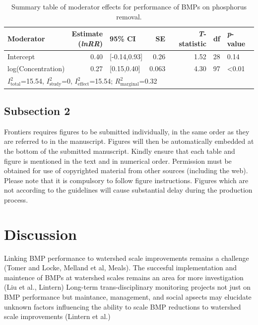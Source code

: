\documentclass[utf8]{FrontiersinHarvard}
\begin{document}
\begin{table}

\caption{Summary table of moderator effects for performance of BMPs on phosphorus removal.}
\centering
\begin{tabular}[t]{lrlrrrl}
\toprule
Moderator & \makecell[r]{Estimate\\(\textit{lnRR})} & 95\% CI & SE & \textit{T}-statistic & df & \textit{p}-value\\
\midrule
Intercept & 0.40 & {}[-0.14,0.93] & 0.26 & 1.52 & 28 & 0.14\\
log(Concentration) & 0.27 & {}[0.15,0.40] & 0.063 & 4.30 & 97 & \textless 0.01\\
\bottomrule
\multicolumn{7}{l}{\rule{0pt}{1em}$I^{2}_{\text{total}}$=15.54, $I^{2}_{\text{study}}$=0, $I^{2}_{\text{effect}}$=15.54; $R^{2}_{\text{marginal}}$=0.32}\\
\end{tabular}
\end{table}

\hypertarget{subsection-2}{%
\subsection{Subsection 2}\label{subsection-2}}

Frontiers requires figures to be submitted individually, in the same
order as they are referred to in the manuscript. Figures will then be
automatically embedded at the bottom of the submitted manuscript. Kindly
ensure that each table and figure is mentioned in the text and in
numerical order. Permission must be obtained for use of copyrighted
material from other sources (including the web). Please note that it is
compulsory to follow figure instructions. Figures which are not
according to the guidelines will cause substantial delay during the
production process.

\hypertarget{discussion}{%
\section{Discussion}\label{discussion}}

Linking BMP performance to watershed scale improvements remains a
challenge (Tomer and Locke, Melland et al, Meals). The succesful
implementation and maintence of BMPs at watershed scales remains an area
for more investigation (Liu et al., Lintern) Long-term
trans-disciplinary monitoring projects not just on BMP performance but
maintance, management, and social apsects may elucidate unknown factors
influencing the ability to scale BMP reductions to watershed scale
improvements (Lintern et al.)
\end{document}
